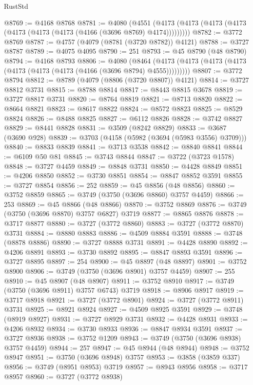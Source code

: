 \begin{lexlean}{RustStd}
\begin{coremodule}
@8769 := @4168 @8768
@8781 := @4080
    (@4551 (@4173 (@4173 (@4173 (@4173 (@4173 (@4173 (@4173 (@4166 (@3696 @8769) @4174)))))))))
@8782 := @3772 @8769
@8787 := @4757 (@4079 (@8781 (@3720 @8782)) @4121)
@8788 := @3727 @8787
@8789 := @4075 @4095
@8790 := 251
@8793 := @45 @8790 (@48 @8790)
@8794 := @4168 @8793
@8806 := @4080
    (@8464 (@4173 (@4173 (@4173 (@4173 (@4173 (@4173 (@4173 (@4166 (@3696 @8794) @4555)))))))))
@8807 := @3772 @8794
@8812 := @8789 (@4079 (@8806 (@3720 @8807)) @4121)
@8814 := @3727 @8812 @3731
@8815 := @8788 @8814
@8817 := @8443 @8815 @3678
@8819 := @3727 @8817 @3731
@8820 := @8764 @8819
@8821 := @8713 @8820
@8822 := @8664 @8821
@8823 := @8617 @8822
@8824 := @8572 @8823
@8825 := @8529 @8824
@8826 := @8488 @8825
@8827 := @6112 @8826
@8828 := @3742 @8827
@8829 := @8441 @8828
@8831 := @3509 (@8242 @8829)
@8833 := @3687 (@3690 @928)
@8839 := @3703 (@4158 (@5982 (@3694 (@5983 @3556) @3709)))
@8840 := @8833 @8839
@8841 := @3713 @3538
@8842 := @8840 @8841
@8844 := @6109 @50 @81
@8845 := @3743 @8844
@8847 := @3722 (@3723 @1578)
@8848 := @3727 @4459
@8849 := @8848 @3731
@8850 := @4428 @8849
@8851 := @4206 @8850
@8852 := @3730 @8851
@8854 := @8847 @8852 @3591
@8855 := @3727 @8854
@8856 := 252
@8859 := @45 @8856 (@48 @8856)
@8860 := @3752 @8859
@8865 := @3749 (@3750 (@3696 @8860) @3757 @4459)
@8866 := 253
@8869 := @45 @8866 (@48 @8866)
@8870 := @3752 @8869
@8876 := @3749 (@3750 (@3696 @8870) @3757 @6827) @3719
@8877 := @8865 @8876
@8878 := @3717 @8877
@8880 := @3727 (@3772 @8860)
@8883 := @3727 (@3772 @8870) @3731
@8884 := @8880 @8883
@8886 := @4509 @8884 @3591
@8888 := @3748 (@8878 @8886)
@8890 := @3727 @8888 @3731
@8891 := @4428 @8890
@8892 := @4206 @8891
@8893 := @3730 @8892
@8895 := @8847 @8893 @3591
@8896 := @3727 @8895
@8897 := 254
@8900 := @45 @8897 (@48 @8897)
@8901 := @3752 @8900
@8906 := @3749 (@3750 (@3696 @8901) @3757 @4459)
@8907 := 255
@8910 := @45 @8907 (@48 @8907)
@8911 := @3752 @8910
@8917 := @3749 (@3750 (@3696 @8911) @3757 @6743) @3719
@8918 := @8906 @8917
@8919 := @3717 @8918
@8921 := @3727 (@3772 @8901)
@8924 := @3727 (@3772 @8911) @3731
@8925 := @8921 @8924
@8927 := @4509 @8925 @3591
@8929 := @3748 (@8919 @8927)
@8931 := @3727 @8929 @3731
@8932 := @4428 @8931
@8933 := @4206 @8932
@8934 := @3730 @8933
@8936 := @8847 @8934 @3591
@8937 := @3727 @8936
@8938 := @3752 @1209
@8943 := @3749 (@3750 (@3696 @8938) @3757 @4459)
@8944 := 257
@8947 := @45 @8944 (@48 @8944)
@8948 := @3752 @8947
@8951 := @3750 (@3696 @8948) @3757
@8953 := @3858 (@3859 @337)
@8956 := @3749 (@8951 @8953) @3719
@8957 := @8943 @8956
@8958 := @3717 @8957
@8960 := @3727 (@3772 @8938)

\end{coremodule}
\end{lexlean}
